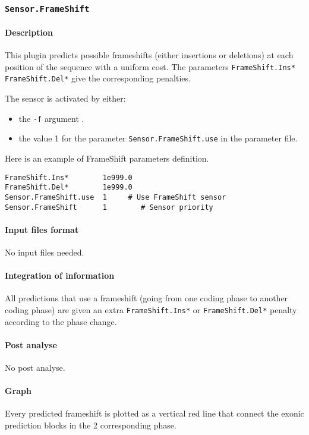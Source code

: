 
\subsubsection{\texttt{Sensor.FrameShift}}

\paragraph{Description}

This plugin predicts possible frameshifts (either insertions or
deletions) at each position of the sequence with a uniform cost. The
parameters \texttt{FrameShift.Ins*} \texttt{FrameShift.Del*} give the
corresponding penalties.

The sensor is activated by either:
\begin{itemize}
\item the \texttt{-f} argument .
\item the value 1 for the parameter \texttt{Sensor.FrameShift.use} in
  the parameter file.
\end{itemize}

Here is an example of FrameShift parameters definition.
\begin{Verbatim}[fontsize=\small]
FrameShift.Ins*        1e999.0
FrameShift.Del*        1e999.0
Sensor.FrameShift.use  1     # Use FrameShift sensor
Sensor.FrameShift      1        # Sensor priority
\end{Verbatim}

\paragraph{Input files format}

No input files  needed.

\paragraph{Integration of information}

All predictions that use a frameshift (going from one coding phase to
another coding phase) are given an extra \texttt{FrameShift.Ins*} or
\texttt{FrameShift.Del*} penalty according to the phase change.

\paragraph{Post analyse}

No post analyse.

\paragraph{Graph}

Every predicted frameshift is plotted as a vertical red line that
connect the exonic prediction blocks in the 2 corresponding phase.


